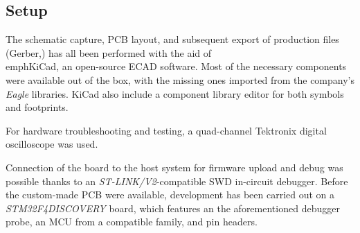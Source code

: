 \subsection{Setup}\label{subsec:hw_setup}

The schematic capture, PCB layout, and subsequent export of production files (Gerber,) has all been performed with the aid of \\emph{KiCad}, an open-source ECAD software.
Most of the necessary components were available out of the box, with the missing ones imported from the company's \emph{Eagle} libraries.
KiCad also include a component library editor for both symbols and footprints.

For hardware troubleshooting and testing, a quad-channel Tektronix digital oscilloscope was used.

Connection of the board to the host system for firmware upload and debug was possible thanks to an \emph{ST-LINK/V2}-compatible SWD in-circuit debugger.
Before the custom-made PCB were available, development has been carried out on a \emph{STM32F4DISCOVERY} board, which features an the aforementioned debugger probe, an MCU from a compatible family, and pin headers.
